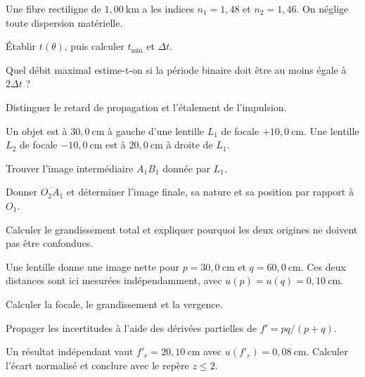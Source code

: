 Une fibre rectiligne de $1{,}00\ \mathrm{km}$ a les indices $n_1=1{,}48$ et $n_2=1{,}46$. On néglige toute dispersion matérielle.
\begin{questions}
\item Établir $t(\theta)$, puis calculer $t_{\min}$ et $\Delta t$.
\item Quel débit maximal estime-t-on si la période binaire doit être au moins égale à $2\Delta t$ ?
\item Distinguer le retard de propagation et l'étalement de l'impulsion.
\end{questions}
Un objet est à $30{,}0\ \mathrm{cm}$ à gauche d'une lentille $L_1$ de focale $+10{,}0\ \mathrm{cm}$. Une lentille $L_2$ de focale $-10{,}0\ \mathrm{cm}$ est à $20{,}0\ \mathrm{cm}$ à droite de $L_1$.
\begin{questions}
\item Trouver l'image intermédiaire $A_1B_1$ donnée par $L_1$.
\item Donner $\overline{O_2A_1}$ et déterminer l'image finale, sa nature et sa position par rapport à $O_1$.
\item Calculer le grandissement total et expliquer pourquoi les deux origines ne doivent pas être confondues.
\end{questions}
Une lentille donne une image nette pour $p=30{,}0\ \mathrm{cm}$ et $q=60{,}0\ \mathrm{cm}$. Ces deux distances sont ici mesurées indépendamment, avec $u(p)=u(q)=0{,}10\ \mathrm{cm}$.
\begin{questions}
\item Calculer la focale, le grandissement et la vergence.
\item Propager les incertitudes à l'aide des dérivées partielles de $f'=pq/(p+q)$.
\item Un résultat indépendant vaut $f'_r=20{,}10\ \mathrm{cm}$ avec $u(f'_r)=0{,}08\ \mathrm{cm}$. Calculer l'écart normalisé et conclure avec le repère $z\leq2$.
\end{questions}

